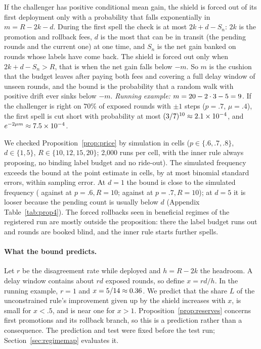 \documentclass[10pt]{article}
\theoremstyle{plain}
\theoremstyle{definition}
\begin{document}
If the challenger has positive conditional mean gain, the shield is forced out of its first deployment only with a probability that falls exponentially in $m=R-2k-d$. During the first spell the check is at most $2k+d-S_n$: $2k$ is the promotion and rollback fees, $d$ is the most that can be in transit (the pending rounds and the current one) at one time, and $S_n$ is the net gain banked on rounds whose labels have come back. The shield is forced out only when $2k+d-S_n>R$, that is when the net gain falls below $-m$. So $m$ is the cushion that the budget leaves after paying both fees and covering a full delay window of unseen rounds, and the bound is the probability that a random walk with positive drift ever sinks below $-m$. \emph{Running example:} $m=20-2\cdot3-5=9$. If the challenger is right on $70\%$ of exposed rounds with $\pm1$ steps ($p=.7$, $\mu=.4$), the first spell is cut short with probability at most $(3/7)^{10}\approx2.1\times10^{-4}$, and $e^{-2\mu m}\approx7.5\times10^{-4}$.

We checked Proposition~\ref{prop:price} by simulation in \PFourCells{} cells ($p\in\{.6,.7,.8\}$, $d\in\{1,5\}$, $R\in\{10,12,15,20\}$; 2{,}000 runs per cell, with the inner rule always proposing, no binding label budget and no ride-out). The simulated frequency exceeds the bound at the point estimate in \PFourAbove{} cells, by at most \PFourMaxZ{} binomial standard errors, within sampling error. At $d=1$ the bound is close to the simulated frequency (\PFourTightEmp{} against \PFourTightBound{} at $p=.6,R=10$; \PFourTightEmpB{} against \PFourTightBoundB{} at $p=.7,R=10$); at $d=5$ it is looser because the pending count is usually below $d$ (Appendix Table~\ref{tab:prop4}). The forced rollbacks seen in beneficial regimes of the registered run are mostly outside the proposition: there the label budget runs out and rounds are booked blind, and the inner rule starts further spells.

\paragraph{What the bound predicts.}
Let $r$ be the disagreement rate while deployed and $h=R-2k$ the headroom. A delay window contains about $rd$ exposed rounds, so define $x=rd/h$. In the running example, $r=1$ and $x=5/14\approx0.36$. We predict that the share $L$ of the unconstrained rule's improvement given up by the shield increases with $x$, is small for $x<.5$, and is near one for $x>1$. Proposition~\ref{prop:reserves} concerns first promotions and its rollback branch, so this is a prediction rather than a consequence. The prediction and test were fixed before the test run; Section~\ref{sec:regimemap} evaluates it.
\end{document}
